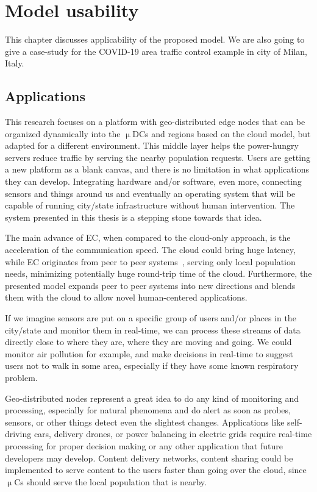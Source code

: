 \chapter{Model usability}\label{chapter:Model usability}
%
%
This chapter discusses applicability of the proposed model. We are also going to give a case-study for the COVID-19 area traffic control example in city of Milan, Italy.
%
\section{Applications}\label{sec:app}
%
This research focuses on a platform with geo-distributed edge nodes that can be organized dynamically into the $\upmu$DCs and regions based on the cloud model, but adapted for a different environment. This middle layer helps the power-hungry servers reduce traffic by serving the nearby population requests. Users are getting a new platform as a blank canvas, and there is no limitation in what applications they can develop. Integrating hardware and/or software, even more, connecting sensors and things around us and eventually an operating system that will be capable of running city/state infrastructure without human intervention. The system presented in this thesis is a stepping stone towards that idea.

The main advance of EC, when compared to the cloud-only approach, is the acceleration of the communication speed. The cloud could bring huge latency, while EC originates from peer to peer systems~\cite{LopezMEDHIBFR15}, serving only local population needs, minimizing potentially huge round-trip time of the cloud. Furthermore, the presented model expands peer to peer systems into new directions and blends them with the cloud to allow novel human-centered applications. 

If we imagine sensors are put on a specific group of users and/or places in the city/state and monitor them in real-time, we can process these streams of data directly close to where they are, where they are moving and going. We could monitor air pollution for example, and make decisions in real-time to suggest users not to walk in some area, especially if they have some known respiratory problem.

Geo-distributed nodes represent a great idea to do any kind of monitoring and processing, especially for natural phenomena and do alert as soon as probes, sensors, or other things detect even the slightest changes. Applications like self-driving cars, delivery drones, or power balancing in electric grids require real-time processing for proper decision making or any other application that future developers may develop. Content delivery networks, content sharing could be implemented to serve content to the users faster than going over the cloud, since $\upmu$Cs should serve the local population that is nearby.
%
%
